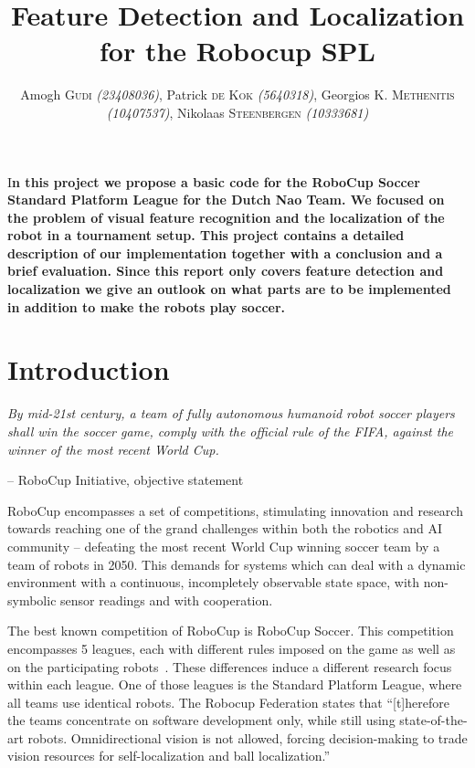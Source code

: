 \documentclass[	DIV=calc,%
							paper=a4,%
							fontsize=9pt,%
							twocolumn]{scrartcl}	 					%
\title{Feature Detection and Localization for the Robocup SPL}					%
\author{Amogh \textsc{Gudi} {\small\emph{(23408036)}}, Patrick \textsc{de Kok} {\small\emph{(5640318)}},
        Georgios \textsc{K. Methenitis} {\small\emph{(10407537)}},
		Nikolaas \textsc{Steenbergen} {\small\emph{(10333681)}}\\}											%
\newcommand{\initial}[1]{%
     \lettrine[lines=3,lhang=0.3,nindent=0em]{
     				\color{DarkGoldenrod}
     				{\textsf{#1}}}{}}
\begin{document}
\maketitle
\thispagestyle{fancy} 			%
\initial{I}\textbf{n this project we propose a basic code for the RoboCup Soccer Standard Platform League for the Dutch Nao Team. We focused on the problem of visual feature recognition and the localization of the robot in a tournament setup. This project contains a detailed description of our implementation together with a conclusion and a brief evaluation. Since this report only covers feature detection and localization we give an outlook on what parts are to be implemented in addition to make the robots play soccer.}

\section{Introduction}
\textit{
By mid-21st century, a team of fully autonomous humanoid robot soccer players shall win the soccer game, comply with the official rule of the FIFA, against the winner of the most recent World Cup.}

\hfill -- RoboCup Initiative, objective statement~\cite{RoboCupObjective,kitano1997robocup}

RoboCup encompasses a set of competitions, stimulating innovation and research towards reaching one of the grand challenges within both the robotics and AI community -- defeating the most recent World Cup winning soccer team by a team of robots in 2050.  This demands for systems which can deal with a dynamic environment with a continuous, incompletely observable state space, with non-symbolic sensor readings and with cooperation.

The best known competition of RoboCup is RoboCup Soccer.  This competition encompasses 5 leagues, each with different rules imposed on the game as well as on the participating robots~\cite{RoboCupSTL}.  These differences induce a different research focus within each league.  One of those leagues is the Standard Platform League, where all teams use identical robots.  The Robocup Federation states that ``[t]herefore the teams concentrate on software development only, while still using state-of-the-art robots. Omnidirectional vision is not allowed, forcing decision-making to trade vision resources for self-localization and ball localization.''~\cite{RoboCupSTL}
\end{document}
